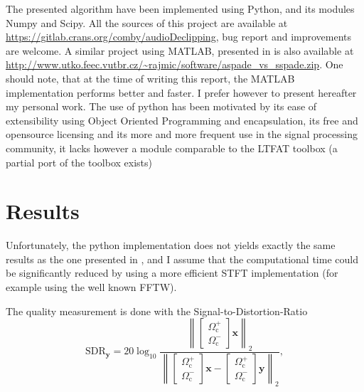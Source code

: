 \documentclass[twocolumn]{scrartcl}
\begin{document}
The presented algorithm have been implemented using Python, and its modules Numpy and Scipy.
All the sources of this project are available at \url{https://gitlab.crans.org/comby/audioDeclipping}, bug report and improvements are welcome. A similar project using MATLAB, presented in \cite{zaviska_revisiting_2018} is also available at \url{http://www.utko.feec.vutbr.cz/~rajmic/software/aspade_vs_sspade.zip}. One should note, that at the time of writing this report, the MATLAB implementation performs better and faster. I prefer however to present hereafter my personal work. The use of python has been motivated by its ease of extensibility using Object Oriented Programming and encapsulation, its free and opensource licensing and its more and more frequent use in the signal processing community, it lacks however a module comparable to the LTFAT toolbox (a partial port of the toolbox exists)


\section{Results}
Unfortunately, the python implementation does not yields exactly the same results as the one presented in , and I assume that the computational time could be significantly reduced by using a more efficient STFT implementation (for example using the well known FFTW).

The quality measurement is done with the Signal-to-Distortion-Ratio \cite{kitic_sparsity_2015-1}
\begin{equation}
  \mathrm{SDR}_{\boldsymbol{y}}=20 \log _{10} \frac{\left\|\left[
        \begin{array}{c}
          \Omega_{\mathrm{c}}^{+} \\
          \Omega_{\mathrm{c}}^{-}
        \end{array}\right]
      \boldsymbol{x}\right\|_{2}}{\left\|\left[
        \begin{array}{c}
          \Omega_{\mathrm{c}}^{+} \\
          \Omega_{\mathrm{c}}^{-}
        \end{array}\right]
      \boldsymbol{x}-
      \left[\begin{array}{c}
              \Omega_{\mathrm{c}}^{+} \\
              \Omega_{\mathrm{c}}^{-}
            \end{array}\right] \boldsymbol{y}\right\|_{2}},
    \end{equation}
\end{document}
